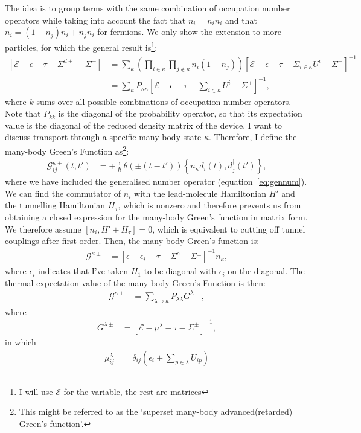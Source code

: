 The idea is to group terms with the same combination of occupation number operators while taking into account the fact that $n_i = n_i n_i$ and that $n_i = (1-n_j)n_i + n_j n_i$  for fermions. We only show the extension to more particles, for which the general result is\footnote{I will use $\mathscr{E}$ for the variable, the rest are matrices}:
\begin{align*}
\left[ \mathscr{E} - \epsilon - \tau -\Sigma^{d\pm} - \Sigma^\pm \right]  &= \sum_\kappa \left( \prod_{i\in\kappa} \prod_{j\notin\kappa} n_i (1-n_j) \right) \left[ \mathscr{E} - \epsilon -\tau - \Sigma_{i \in \kappa}U^i - \Sigma^\pm \right]^{-1} \\
&= \sum_\kappa P_{\kappa\kappa} \left[ \mathscr{E} - \epsilon - \tau - \sum_{i\in\kappa} U^i - \Sigma^\pm \right]^{-1},
\end{align*}
where $k$ sums over all possible combinations of occupation number operators. Note that $P_{kk}$ is the diagonal of the probability operator, so that its expectation value is the diagonal of the reduced density matrix of the device. I want to discuss transport through a specific many-body state $\kappa$. Therefore, I define the many-body Green's Function as\footnote{This might be referred to as the `superset many-body advanced(retarded) Green's function'.}:
\begin{align}
\mathscr{G}^{\kappa\pm}_{ij} (t,t') &= \mp \frac{\imath}{\hbar} \theta(\pm(t-t'))\left\{ n_\kappa d_i(t), d_j^\dagger (t')\right\},
\label{eq:mbgfdef}
\end{align}
where we have included the generalised number operator (equation~\ref{eq:gennum}). We can find the commutator of $n_i$ with the lead-molecule Hamiltonian $H'$ and the tunnelling Hamiltonian $H_\tau$, which is nonzero and therefore prevents us from obtaining a closed expression for the many-body Green's function in matrix form. We therefore assume $\left[ n_i, H' + H_\tau \right]=0$, which is equivalent to cutting off tunnel couplings after first order. Then, the many-body Green's function is:
\begin{align}
\mathscr{G}^{\kappa\pm} &= \left[ \epsilon - \epsilon_i - \tau - \Sigma^c - \Sigma^\pm\right]^{-1} n_\kappa,
\label{eq:mbgfmatrix}
\end{align}
where $\epsilon_i$ indicates that I've taken $H_1$ to be diagonal with $\epsilon_i$ on the diagonal. The thermal expectation value of the many-body Green's Function is then:
\begin{align}
\mathscr{G}^{\kappa\pm} &= \sum_{\lambda\supseteq\kappa} P_{\lambda\lambda} G^{\lambda\pm},\label{eq:mbgfresult}
\end{align}
where 
\begin{align*}
G^{\lambda\pm} &= \left[\mathscr{E} - \mu^\lambda - \tau - \Sigma^\pm \right]^{-1},
\end{align*}
in which
\begin{align}
\mu^\lambda_{ij} &= \delta_{ij} \left( \epsilon_i + \sum_{p\in\lambda} U_{ip} \right) \label{eq:result}
\end{align}

